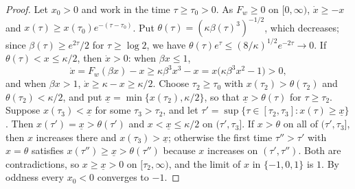 \documentclass{article} %
\theoremstyle{plain}
\theoremstyle{definition}
\theoremstyle{remark}
\begin{document}
\begin{proof}
Let $x_0>0$ and work in the time $\tau\ge\tau_0>0$. As $F_w\ge0$ on $[0,\infty)$, $\dot x\ge-x$ and
$x(\tau)\ge x(\tau_0)e^{-(\tau-\tau_0)}$. Put $\theta(\tau)=(\kappa\beta(\tau)^3)^{-1/2}$, which
decreases; since $\beta(\tau)\ge e^{2\tau}/2$ for $\tau\ge\log2$, we have
$\theta(\tau)e^\tau\le(8/\kappa)^{1/2}e^{-2\tau}\to0$. If $\theta(\tau)<x\le\kappa/2$, then
$\dot x>0$: when $\beta x\le1$,
\[
\dot x=F_w(\beta x)-x\ge\kappa\beta^3x^3-x=x\bigl(\kappa\beta^3x^2-1\bigr)>0,
\]
and when $\beta x>1$, $\dot x\ge\kappa-x\ge\kappa/2$. Choose $\tau_2\ge\tau_0$ with
$x(\tau_2)>\theta(\tau_2)$ and $\theta(\tau_2)<\kappa/2$, and put
$\underline x=\min\{x(\tau_2),\kappa/2\}$, so that $\underline x>\theta(\tau)$ for $\tau\ge\tau_2$.
Suppose $x(\tau_3)<\underline x$ for some $\tau_3>\tau_2$, and let
$\tau'=\sup\{\tau\in[\tau_2,\tau_3]:x(\tau)\ge\underline x\}$. Then
$x(\tau')=\underline x>\theta(\tau')$ and $x<\underline x\le\kappa/2$ on $(\tau',\tau_3]$. If
$x>\theta$ on all of $(\tau',\tau_3]$, then $x$ increases there and $x(\tau_3)>\underline x$;
otherwise the first time $\tau''>\tau'$ with $x=\theta$ satisfies
$x(\tau'')\ge\underline x>\theta(\tau'')$ because $x$ increases on $(\tau',\tau'')$. Both are
contradictions, so $x\ge\underline x>0$ on $[\tau_2,\infty)$, and the limit of $x$ in
$\{-1,0,1\}$ is $1$. By oddness every $x_0<0$ converges to $-1$.
\end{proof}
\end{document}
